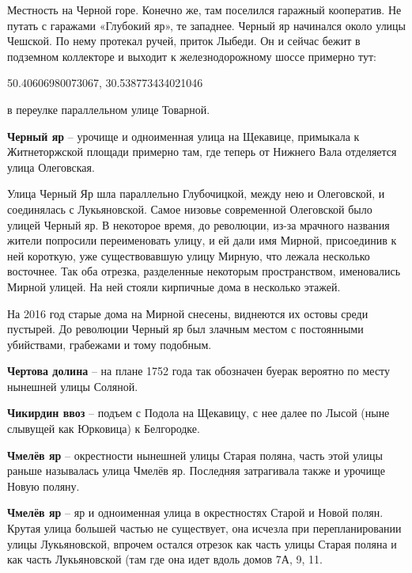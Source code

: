Местность на Черной горе. Конечно же, там поселился гаражный кооператив. Не путать с гаражами «Глубокий яр», те западнее. Черный яр начинался около улицы Чешской. По нему протекал ручей, приток Лыбеди. Он и сейчас бежит в подземном коллекторе и выходит к железнодорожному шоссе примерно тут:

50.40606980073067, 30.538773434021046

в переулке параллельном улице Товарной.\\

\medskip

\textbf{Черный яр} – урочище и одноименная улица на Щекавице, примыкала к Житнеторжской площади примерно там, где теперь от Нижнего Вала отделяется улица Олеговская. 

Улица Черный Яр шла параллельно Глубочицкой, между нею и Олеговской, и соединялась с Лукьяновской. Самое низовье современной Олеговской было улицей Черный яр. В некоторое время, до революции, из-за мрачного названия жители попросили переименовать улицу, и ей дали имя Мирной, присоединив к ней короткую, уже существовавшую улицу Мирную, что лежала несколько восточнее. Так оба отрезка, разделенные некоторым пространством, именовались Мирной улицей. На ней стояли кирпичные дома в несколько этажей.

На 2016 год старые дома на Мирной снесены, виднеются их остовы среди пустырей. До революции Черный яр был злачным местом с постоянными убийствами, грабежами и тому подобным.\\

\medskip


\textbf{Чертова долина} – на плане 1752 года так обозначен буерак вероятно по месту нынешней улицы Соляной.\\

\medskip


\textbf{Чикирдин ввоз} – подъем с Подола на Щекавицу, с нее далее по Лысой (ныне слывущей как Юрковица) к Белгородке.\\

\medskip


\textbf{Чмелёв яр} – окрестности нынешней улицы Старая поляна, часть этой улицы раньше называлась улица Чмелёв яр. Последняя затрагивала также и урочище Новую поляну.\\

\medskip


\textbf{Чмелёв яр} – яр и одноименная улица в окрестностях Старой и Новой полян. Крутая улица большей частью не существует, она исчезла при перепланировании улицы Лукьяновской, впрочем остался отрезок как часть улицы Старая поляна и как часть Лукьяновской (там где она идет вдоль домов 7А, 9, 11.

